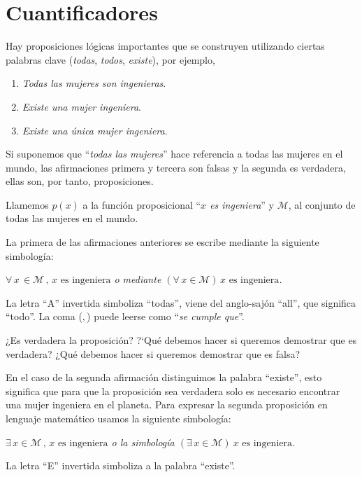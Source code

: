 \section{Cuantificadores}

Hay proposiciones l\'ogicas importantes que se construyen utilizando
ciertas palabras clave ({\em todas}, {\em todos}, {\em existe}), por ejemplo,

\begin{ejemplo}\leavevmode
\begin{enumerate}
\item {\em Todas las mujeres son ingenieras}.
\item {\em Existe una mujer ingeniera}.
\item {\em Existe una única mujer ingeniera}.
\end{enumerate}

Si suponemos que ``{\em todas las mujeres}'' 
hace referencia a todas las mujeres en el mundo, 
las afirmaciones primera y tercera son falsas y la segunda
es verdadera, ellas son, por tanto, proposiciones.

Llamemos $p(x)$ a la funci\'on proposicional ``{\em $x$ es ingeniera}'' y 
${\mathcal M}$, al conjunto de todas las mujeres en el mundo. 

La primera de las afirmaciones anteriores
se escribe mediante la siguiente simbología:

\centerline{\em $\forall\, x \, \in {\mathcal M}\,,\, x \textrm{ es ingeniera}$
\quad o mediante \quad $(\forall\, x \in {\mathcal M})\, x \textrm{ es ingeniera}$.}

La letra ``A'' invertida simboliza ``todas'', viene del anglo-sajón ``all'', 
que significa ``todo''. La coma ($,$) puede leerse como ``{\em se 
cumple que}''.

¿Es verdadera la proposición? 
?`Qu\'e debemos hacer si queremos demostrar que es verdadera?
¿Qu\'e debemos hacer si queremos demostrar que es falsa? 

En el caso de la segunda afirmación 
distinguimos la palabra ``existe'', 
esto significa que para que la proposición sea verdadera 
solo es necesario encontrar una mujer ingeniera en el planeta.
Para expresar la segunda proposición en lenguaje matemático usamos la siguiente 
simbología:

\centerline{\em $\exists\, x \in {\mathcal M}\,,\, x \textrm{ es ingeniera}$
\quad o la simbolog\'ia \quad $(\exists\, x \in {\mathcal M})\ x \textrm{ es 
	ingeniera}$.}

La letra ``E'' invertida simboliza a la palabra ``existe''.


\end{ejemplo}
